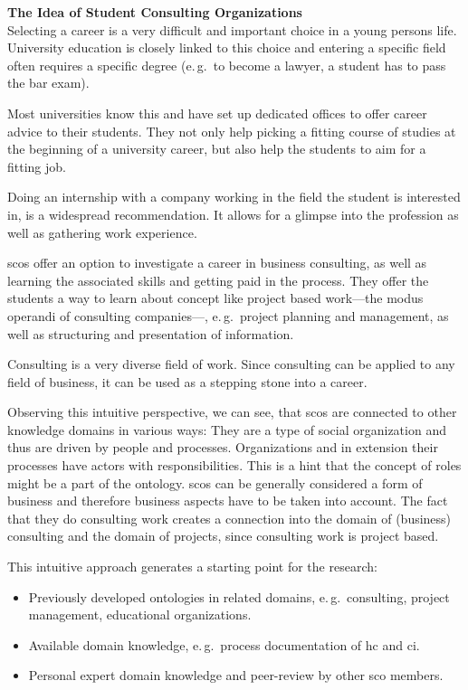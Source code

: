 \documentclass[a4paper, DIV=13, BCOR=0cm]{scrbook}
\newcommand{\eg}{e.\,g.\ }
\begin{document}
\begin{mdframed}
	\textbf{The Idea of Student Consulting Organizations}\\
	Selecting a career is a very difficult and important choice in a young persons life. University education is closely linked to this choice and entering a specific field often requires a specific degree (\eg to become a lawyer, a student has to pass the bar exam).

	Most universities know this and have set up dedicated offices to offer career advice to their students. They not only help picking a fitting course of studies at the beginning of a university career, but also help the students to aim for a fitting job.

	Doing an internship with a company working in the field the student is interested in, is a widespread recommendation. It allows for a glimpse into the profession as well as gathering work experience.

	\glspl{sco} offer an option to investigate a career in business consulting, as well as learning the associated skills and getting paid in the process. They offer the students a way to learn about concept like project based work---the modus operandi of consulting companies---, \eg project planning and management, as well as structuring and presentation of information.

	Consulting is a very diverse field of work. Since consulting can be applied to any field of business, it can be used as a stepping stone into a career.
\end{mdframed}

Observing this intuitive perspective, we can see, that \glspl{sco} are connected to other knowledge domains in various ways: They are a type of social organization and thus are driven by people and processes. Organizations and in extension their processes have actors with responsibilities. This is a hint that the concept of roles might be a part of the ontology. \glspl{sco} can be generally considered a form of business and therefore business aspects have to be taken into account. The fact that they do consulting work creates a connection into the domain of (business) consulting and the domain of projects, since consulting work is project based.

This intuitive approach generates a starting point for the research:
\begin{itemize}
	\item Previously developed ontologies in related domains, \eg consulting, project management, educational organizations.
	\item Available domain knowledge, \eg process documentation of \gls{hc} and \gls{ci}.
	\item Personal expert domain knowledge and peer-review by other \gls{sco} members.
\end{itemize}
\end{document}
